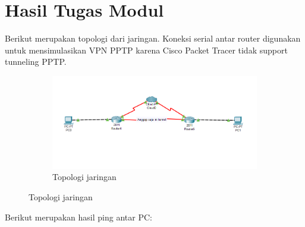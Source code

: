 \section{Hasil Tugas Modul}
Berikut merupakan topologi dari jaringan. Koneksi serial antar router digunakan untuk mensimulasikan VPN PPTP karena Cisco Packet Tracer tidak support tunneling PPTP.
\begin{figure}[H]
	\centering
	\begin{subfigure}[b]{0.4\linewidth}
		\includegraphics[width=\linewidth]{P5/img/tumod (1).png}
		\caption{Topologi jaringan\label{fig:konfigurasiR1}}
	\end{subfigure}
\end{figure}
Berikut merupakan hasil ping antar PC:
